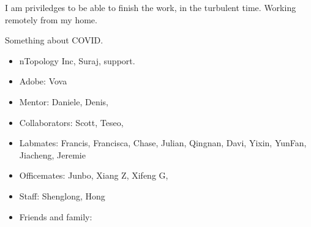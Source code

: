 I am priviledges to be able to finish the work, in the turbulent time.
Working remotely from my home.

Something about COVID.

\begin{itemize}
  \item nTopology Inc, Suraj, support.
  \item Adobe: Vova
  \item Mentor: Daniele, Denis, 
  \item Collaborators: Scott, Teseo, 
  \item Labmates: Francis, Francisca, Chase, Julian, Qingnan, Davi, Yixin, YunFan, Jiacheng, Jeremie
  \item Officemates: Junbo, Xiang Z, Xifeng G, 
  \item Staff: Shenglong, Hong
  \item Friends and family: 
\end{itemize}

